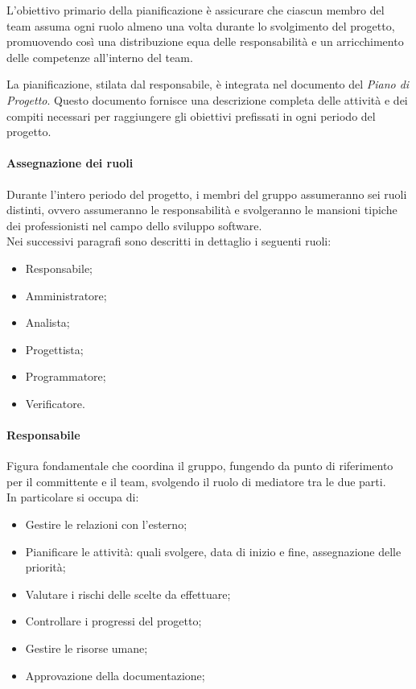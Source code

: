 L'obiettivo primario della pianificazione è assicurare che ciascun membro del team assuma ogni ruolo almeno una volta durante lo svolgimento del progetto, promuovendo così una distribuzione equa delle responsabilità e un arricchimento delle competenze all'interno del team.

\vspace{0,1cm}

La pianificazione, stilata dal responsabile, è integrata nel documento del \textit{Piano di Progetto}. Questo documento fornisce una descrizione completa delle attività e dei compiti necessari per raggiungere gli obiettivi prefissati in ogni periodo del progetto.
\paragraph{Assegnazione dei ruoli}

Durante l'intero periodo del progetto, i membri del gruppo assumeranno sei ruoli distinti, ovvero assumeranno le responsabilità e svolgeranno le mansioni tipiche dei professionisti nel campo dello sviluppo software. \\
Nei successivi paragrafi sono descritti in dettaglio i seguenti ruoli:
\begin{itemize}
  \item Responsabile;
  \item Amministratore;
  \item Analista;
  \item Progettista;
  \item Programmatore;
  \item Verificatore.
\end{itemize}

\paragraph{Responsabile}\label{responsabile} Figura fondamentale che coordina il gruppo, fungendo da punto di riferimento per il committente e il team, svolgendo il ruolo di mediatore tra le due parti. \\
In particolare si occupa di:
\begin{itemize}
    \item Gestire le relazioni con l'esterno;
    \item Pianificare le attività: quali svolgere, data di inizio e fine, assegnazione delle priorità;
    \item Valutare i rischi delle scelte da effettuare;
    \item Controllare i progressi del progetto;
    \item Gestire le risorse umane;
    \item Approvazione della documentazione;
\end{itemize}

